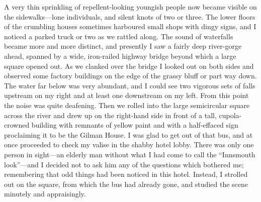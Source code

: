       A very thin sprinkling of repellent-looking youngish people now became visible on the sidewalks—lone individuals, and silent knots of two or three. The lower floors of the crumbling houses sometimes harboured small shops with dingy signs, and I noticed a parked truck or two as we rattled along. The sound of waterfalls became more and more distinct, and presently I saw a fairly deep river-gorge ahead, spanned by a wide, iron-railed highway bridge beyond which a large square opened out. As we clanked over the bridge I looked out on both sides and observed some factory buildings on the edge of the grassy bluff or part way down. The water far below was very abundant, and I could see two vigorous sets of falls upstream on my right and at least one downstream on my left. From this point the noise was quite deafening. Then we rolled into the large semicircular square across the river and drew up on the right-hand side in front of a tall, cupola-crowned building with remnants of yellow paint and with a half-effaced sign proclaiming it to be the Gilman House.
      I was glad to get out of that bus, and at once proceeded to check my valise in the shabby hotel lobby. There was only one person in sight—an elderly man without what I had come to call the “Innsmouth look”—and I decided not to ask him any of the questions which bothered me; remembering that odd things had been noticed in this hotel. Instead, I strolled out on the square, from which the bus had already gone, and studied the scene minutely and appraisingly.